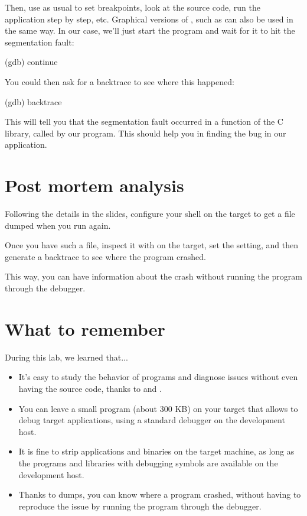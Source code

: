 Then, use  as usual to set breakpoints, look at the source
code, run the application step by step, etc. Graphical versions of
, such as  can also be used in the same way.
In our case, we'll just start the program and wait for it to hit
the segmentation fault:
\begin{bashinput}
(gdb) continue
\end{bashinput}

You could then ask for a backtrace to see where this happened:
\begin{bashinput}
(gdb) backtrace
\end{bashinput}

This will tell you that the segmentation fault occurred in a function
of the C library, called by our program. This should help you in
finding the bug in our application.

\section{Post mortem analysis}

Following the details in the slides, configure your shell on the
target to get a  file dumped when you run 
again.

Once you have such a file, inspect it with  on
the target, set the  setting, and then generate
a backtrace to see where the program crashed.

This way, you can have information about the crash without
running the program through the debugger.

\section{What to remember}

During this lab, we learned that...
\begin{itemize}

\item It's easy to study the behavior of programs and diagnose issues
  without even having the source code, thanks to  and
  .

\item You can leave a small  program (about 300 KB) on your target
  that allows to debug target applications, using a standard 
  debugger on the development host.

\item It is fine to strip applications and binaries on the target
  machine, as long as the programs and libraries with debugging
  symbols are available on the development host.

\item Thanks to  dumps, you can know where a program crashed,
  without having to reproduce the issue by running the program through
  the debugger.

\end{itemize}
